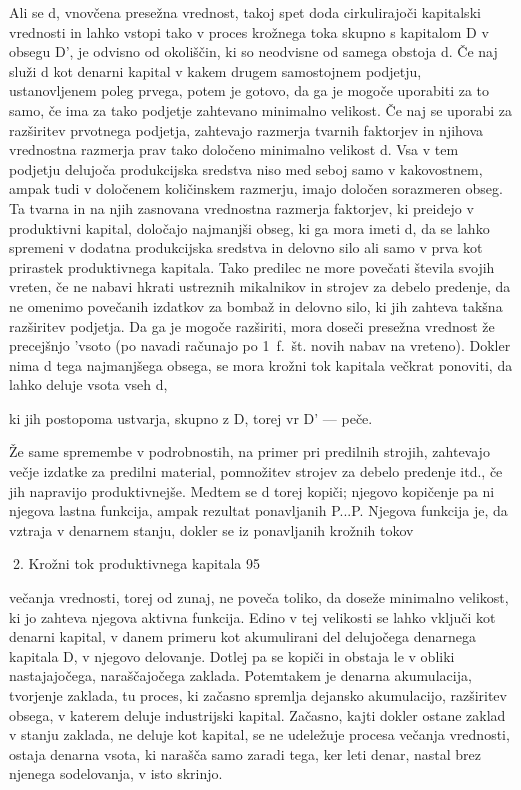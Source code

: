 \documentclass[kapital_02.tex]{subfiles}
\begin{document}
Ali se d, vnovčena presežna vrednost, takoj spet doda cirkulirajoči kapitalski vrednosti in lahko vstopi tako v proces krožnega toka skupno s kapitalom D v obsegu D', je odvisno od okoliščin, ki so neodvisne od samega obstoja d. Če naj služi d kot denarni kapital v kakem drugem samostojnem podjetju, ustanovljenem poleg prvega, potem je gotovo, da ga je mogoče uporabiti za to samo, če ima za tako podjetje zahtevano minimalno velikost. Če naj se uporabi za razširitev prvotnega podjetja, zahtevajo razmerja tvarnih faktorjev in njihova vrednostna razmerja prav tako določeno minimalno velikost d. Vsa v tem podjetju delujoča produkcijska sredstva niso med seboj samo v kakovostnem, ampak tudi v določenem količinskem razmerju, imajo določen sorazmeren obseg. Ta tvarna in na njih zasnovana vrednostna razmerja faktorjev, ki preidejo v produktivni kapital, določajo najmanjši obseg, ki ga mora imeti d, da se lahko spremeni v dodatna produkcijska sredstva in delovno silo ali samo v prva kot prirastek produktivnega kapitala. Tako predilec ne more povečati števila svojih vreten, če ne nabavi hkrati ustreznih mikalnikov in strojev za debelo predenje, da ne omenimo povečanih izdatkov za bombaž in delovno silo, ki jih zahteva takšna razširitev podjetja. Da ga je mogoče razširiti, mora doseči presežna vrednost že precejšnjo 'vsoto (po navadi računajo po 1~f.~št. novih nabav na vreteno). Dokler nima d tega najmanjšega obsega, se mora krožni tok kapitala večkrat ponoviti, da lahko deluje vsota vseh d,

ki jih postopoma ustvarja, skupno z D, torej vr D' — peče.

Že same spremembe v podrobnostih, na primer pri predilnih strojih, zahtevajo večje izdatke za predilni material, pomnožitev strojev za debelo predenje itd., če jih napravijo produktivnejše. Medtem se d torej kopiči; njegovo kopičenje pa ni njegova lastna funkcija, ampak rezultat ponavljanih P...P. Njegova funkcija je, da vztraja v denarnem stanju, dokler se iz ponavljanih krožnih tokov



2. Krožni tok produktivnega kapitala 95



 večanja vrednosti, torej od zunaj, ne poveča toliko, da doseže minimalno velikost, ki jo zahteva njegova aktivna funkcija. Edino v tej velikosti se lahko vključi kot denarni kapital, v danem primeru kot akumulirani del delujočega denarnega kapitala D, v njegovo delovanje. Dotlej pa se kopiči in obstaja le v obliki nastajajočega, naraščajočega zaklada. Potemtakem je denarna akumulacija, tvorjenje zaklada, tu proces, ki začasno spremlja dejansko akumulacijo, razširitev obsega, v katerem deluje industrijski kapital. Začasno, kajti dokler ostane zaklad v stanju zaklada, ne deluje kot kapital, se ne udeležuje procesa večanja vrednosti, ostaja denarna vsota, ki narašča samo zaradi tega, ker leti denar, nastal brez njenega sodelovanja, v isto skrinjo.
\end{document}
